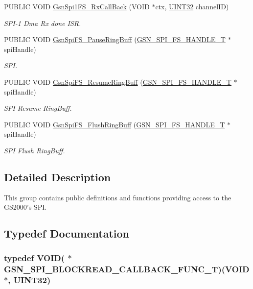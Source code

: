 \begin{DoxyCompactItemize}
PUBLIC VOID \hyperlink{a00655_gab81899267cc21d0f6ff6300815b941a6}{GsnSpi1FS\_\-RxCallBack} (VOID $\ast$ctx, \hyperlink{a00660_gae1e6edbbc26d6fbc71a90190d0266018}{UINT32} channelID)
\begin{DoxyCompactList}\small\item\em SPI-\/1 Dma Rx done ISR. \end{DoxyCompactList}\item 
PUBLIC VOID \hyperlink{a00655_ga4c4df1f73de7ec7af0d04cc1804c5679}{GsnSpiFS\_\-PauseRingBuff} (\hyperlink{a00234}{GSN\_\-SPI\_\-FS\_\-HANDLE\_\-T} $\ast$spiHandle)
\begin{DoxyCompactList}\small\item\em SPI. \end{DoxyCompactList}\item 
PUBLIC VOID \hyperlink{a00655_ga7a8f0b4b3c8a79b1c9158aac0bbe0879}{GsnSpiFS\_\-ResumeRingBuff} (\hyperlink{a00234}{GSN\_\-SPI\_\-FS\_\-HANDLE\_\-T} $\ast$spiHandle)
\begin{DoxyCompactList}\small\item\em SPI Resume RingBuff. \end{DoxyCompactList}\item 
PUBLIC VOID \hyperlink{a00655_gaf65c6cdbb2571726a4cde5afab94a6fa}{GsnSpiFS\_\-FlushRingBuff} (\hyperlink{a00234}{GSN\_\-SPI\_\-FS\_\-HANDLE\_\-T} $\ast$spiHandle)
\begin{DoxyCompactList}\small\item\em SPI Flush RingBuff. \end{DoxyCompactList}\end{DoxyCompactItemize}


\subsection{Detailed Description}
This group contains public definitions and functions providing access to the GS2000's SPI. 

\subsection{Typedef Documentation}
\hypertarget{a00655_ga40c92f454b32d5fffa9780896cecdd02}{
\subsubsection[{GSN\_\-SPI\_\-BLOCKREAD\_\-CALLBACK\_\-FUNC\_\-T}]{\setlength{\rightskip}{0pt plus 5cm}typedef VOID( $\ast$ {\bf GSN\_\-SPI\_\-BLOCKREAD\_\-CALLBACK\_\-FUNC\_\-T})(VOID $\ast$, {\bf UINT32})}}
\label{a00655_ga40c92f454b32d5fffa9780896cecdd02}


